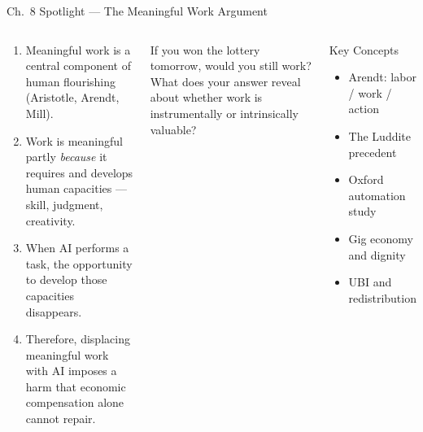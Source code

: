 \documentclass[aspectratio=169,10pt]{beamer}
\begin{document}
\begin{frame}[shrink=5]{Ch.~8 Spotlight --- The Meaningful Work Argument}
\begin{columns}[c]
\begin{argumentbox}
\footnotesize
\begin{enumerate}
  \item Meaningful work is a central component of human flourishing (Aristotle, Arendt, Mill).
  \item Work is meaningful partly \emph{because} it requires and develops human capacities --- skill, judgment, creativity.
  \item When AI performs a task, the opportunity to develop those capacities disappears.
  \item Therefore, displacing meaningful work with AI imposes a harm that economic compensation alone cannot repair.
\end{enumerate}
\end{argumentbox}
\vspace{0.25em}
\begin{discussionbox}
\footnotesize If you won the lottery tomorrow, would you still work? What does your answer reveal about whether work is instrumentally or intrinsically valuable?
\end{discussionbox}
\begin{block}{Key Concepts}
\footnotesize
\begin{itemize}
  \item Arendt: labor / work / action
  \item The Luddite precedent
  \item Oxford automation study
  \item Gig economy and dignity
  \item UBI and redistribution
\end{itemize}
\end{block}
\end{columns}
\end{frame}
\end{document}
